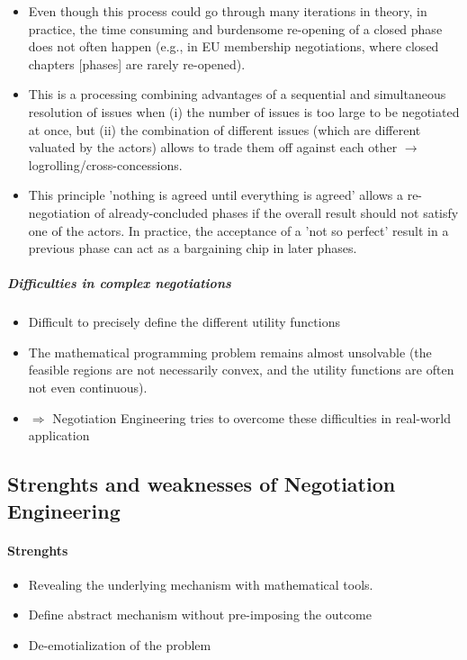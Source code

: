 \begin{itemize}
    \item Even though this process could go through many iterations in
        theory, in practice, the time consuming and burdensome re-opening of
        a closed phase does not often happen (e.g., in EU membership negotiations,
        where closed chapters [phases] are rarely re-opened).
    \item This is a processing combining advantages of a sequential and simultaneous
        resolution of issues when (i) the number of issues is too large to be
        negotiated at once, but (ii) the combination of different issues (which
        are different valuated by the actors) allows to trade them off against
        each other $\rightarrow$ logrolling/cross-concessions.
    \item This principle 'nothing is agreed until everything is agreed' allows
        a re-negotiation of already-concluded phases if the overall result
        should not satisfy one of the actors. In practice, the acceptance of a
        'not so perfect' result in a previous phase can act as a bargaining
        chip in later phases.
\end{itemize}

\subparagraph{Difficulties in complex negotiations}

\begin{itemize}
    \item Difficult to precisely define the different utility functions
    \item The mathematical programming problem remains almost unsolvable
        (the feasible regions are not necessarily convex, and the utility
        functions are often not even continuous).
    \item $\Rightarrow$ Negotiation Engineering tries to overcome these
        difficulties in real-world application
\end{itemize}

\subsection{Strenghts and weaknesses of Negotiation Engineering}

\paragraph{Strenghts}

\begin{itemize}
    \item Revealing the underlying mechanism with mathematical tools.
    \item Define abstract mechanism without pre-imposing the outcome
    \item De-emotialization of the problem
\end{itemize}

